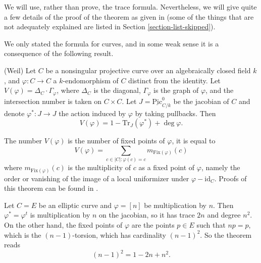 \noindent
We will use, rather than prove, the trace formula. Nevertheless, we will
give quite a few details of the proof of the theorem as given in
\cite{SGA4.5} (some of the things that are not adequately explained
are listed in Section \ref{section-list-skipped}).

\medskip\noindent
We only stated the formula for curves, and in some weak
sense it is a consequence of the following result.

\begin{theorem}
\label{theorem-weil-trace-formula}
(Weil)
Let $C$ be a nonsingular projective curve over an algebraically closed field
$k$, and $\varphi : C \to C$ a $k$-endomorphism of $C$ distinct from the
identity. Let $V(\varphi) = \Delta_C \cdot \Gamma_\varphi$, where $\Delta_C$ is
the diagonal, $\Gamma_\varphi$ is the graph of $\varphi$, and the intersection
number is taken on $C\times C$. Let $J = \underline{\text{Pic}}^0_{C/k}$ be the
jacobian of $C$ and denote $\varphi^* : J \to J$ the action induced by
$\varphi$ by taking pullbacks. Then
$$
V(\varphi) = 1 - \text{Tr}_J(\varphi^*) + \deg \varphi.
$$
\end{theorem}

The number $V(\varphi)$ is the number of fixed points of $\varphi$, it is equal
to
$$
V(\varphi) = \sum_{c \in |C| : \varphi(c) = c} m_\text{Fix$(\varphi)$} (c)
$$
where $m_\text{Fix$(\varphi)$} (c)$ is the multiplicity of $c$ as a fixed point
of $\varphi$, namely the order or vanishing of the image of a local uniformizer
under $\varphi - \text{id}_C$. Proofs of this theorem can be found in
\cite{Lang, Weil}.

\begin{example}
\label{example-elliptic-curve}
Let $C = E$ be an elliptic curve and $\varphi = [n]$ be multiplication by $n$.
Then $\varphi^* = \varphi^t$ is multiplication by $n$ on the jacobian, so it
has trace $2n$ and degree $n^2$. On the other hand, the fixed points of
$\varphi$ are the points $p \in E$ such that $n p = p$, which is the
$(n-1)$-torsion, which has cardinality $(n-1)^2$. So the theorem reads
$$
(n-1)^2 = 1 - 2n + n^2.
$$
\end{example}

